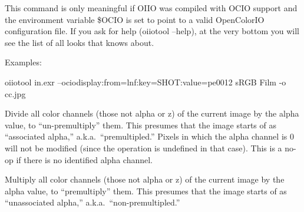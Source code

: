 This command is only meaningful if OIIO was compiled with OCIO support
and the environment variable {\cf \$OCIO} is set to point to a valid
OpenColorIO configuration file.  If you ask for \oiiotool help 
({\cf oiiotool --help}), at the very bottom you will see the list of all
looks that \oiiotool knows about.

\noindent Examples:
\begin{tinycode}
  oiiotool in.exr --ociodisplay:from=lnf:key=SHOT:value=pe0012 sRGB Film -o cc.jpg
\end{tinycode}

\apiend

Divide all color channels (those not alpha or z) of the current image by
the alpha value, to ``un-premultiply'' them.  This presumes that the
image starts of as ``associated alpha,'' a.k.a.\ ``premultipled.''
Pixels in which the alpha channel is 0 will not be modified (since the
operation is undefined in that case).  This is a no-op if there is no
identified alpha channel.
\apiend

Multiply all color channels (those not alpha or z) of the current image
by the alpha value, to ``premultiply'' them.  This presumes that the
image starts of as ``unassociated alpha,'' a.k.a.\ ``non-premultipled.''
\apiend


